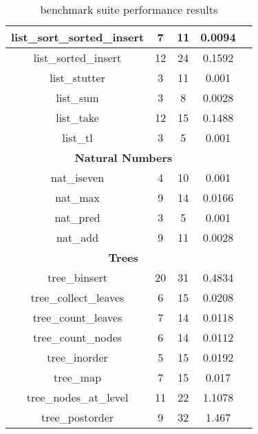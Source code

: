 \begin{table}
\begin{center}
\begin{tabular}{|c|c|c|c|c|}
list\_sort\_sorted\_insert & 7 & 11 & 0.0094 \\
\hline
list\_sorted\_insert & 12 & 24 & 0.1592 \\
\hline
list\_stutter & 3 & 11 & 0.001 \\
\hline
list\_sum & 3 & 8 & 0.0028 \\
\hline
list\_take & 12 & 15 & 0.1488 \\
\hline
list\_tl & 3 & 5 & 0.001 \\
\hline
\multicolumn{4}{|c|}{\textbf{Natural Numbers}} \\
\hline
nat\_iseven & 4 & 10 & 0.001 \\
\hline
nat\_max & 9 & 14 & 0.0166 \\
\hline
nat\_pred & 3 & 5 & 0.001 \\
\hline
nat\_add & 9 & 11 & 0.0028 \\
\hline
\multicolumn{4}{|c|}{\textbf{Trees}} \\
\hline
tree\_binsert & 20 & 31 & 0.4834 \\
\hline
tree\_collect\_leaves & 6 & 15 & 0.0208 \\
\hline
tree\_count\_leaves & 7 & 14 & 0.0118 \\
\hline
tree\_count\_nodes & 6 & 14 & 0.0112 \\
\hline
tree\_inorder & 5 & 15 & 0.0192 \\
\hline
tree\_map & 7 & 15 & 0.017 \\
\hline
tree\_nodes\_at\_level & 11 & 22 & 1.1078 \\
\hline
tree\_postorder & 9 & 32 & 1.467 \\

  \hline
  \end{tabular}
  \end{center}
  \caption{\myth{} benchmark suite performance results}
  \label{fig:myth-raw-benchmarks}
\end{table}
